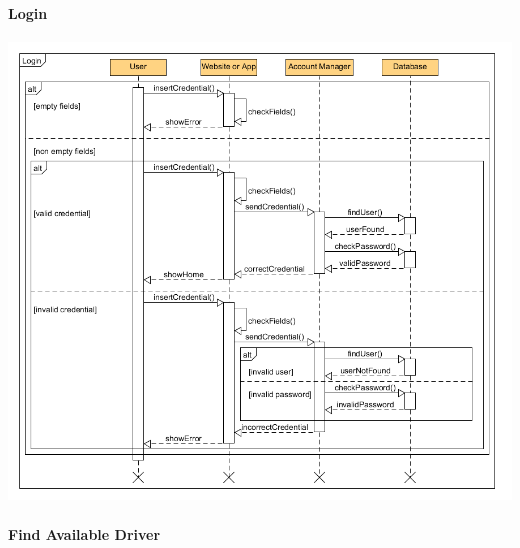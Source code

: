 \paragraph{Login}
\begin{center}
	\includegraphics[width=\textwidth]{diagrams/Login.png}
\end{center}


\paragraph{Find Available Driver}



